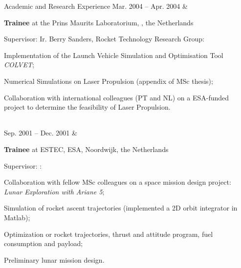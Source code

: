 \documentclass[a4paper,12pt]{article}
\newcommand{\dynhref}[2]{%
  \iftoggle{expliciturl}{%
    #2 \footnote{\href{http://#1}{\detokenize{#1}}}%
  }{%
    \href{http://#1}{#2}%
  }%
}
\begin{document}
\begin{cvsection}{Academic and Research Experience}
Mar. 2004 -- Apr. 2004 &
  \begin{itti}
    \item \textbf{Trainee} at the Prins Maurits Laboratorium, \dynhref{www.tno.nl/}{TNO}, the Netherlands
    \item Supervisor: Ir. Berry Sanders, Rocket Technology Research Group:
    \begin{ittib}
      \item Implementation of the Launch Vehicle Simulation and Optimisation Tool \emph{COLVET};
      \item Numerical Simulations on Laser Propulsion (appendix of MSc thesis);
      \item Collaboration with international colleagues (PT and NL) on a \acf{ESA}-funded project to determine the feasibility of Laser Propulsion.
    \end{ittib}
  \end{itti}\\

Sep. 2001 -- Dec. 2001 &
  \begin{itti}
    \item \textbf{Trainee} at \acf{ESTEC}, \ac{ESA}, Noordwijk, the Netherlands
    \item Supervisor: \dynhref{en.wikipedia.org/wiki/Wubbo_Ockels}{Prof. Wubbo Ockels}:
    \begin{ittib}
      \item Collaboration with fellow MSc colleagues on a space mission design project: \emph{Lunar Exploration with Ariane 5};
      \item Simulation of rocket ascent trajectories (implemented a 2D orbit integrator in Matlab);
      \item Optimization or rocket trajectories, thrust and attitude program, fuel consumption and payload;
      \item Preliminary lunar mission design.
    \end{ittib}
  \end{itti}\\

\end{cvsection}
\end{document}
